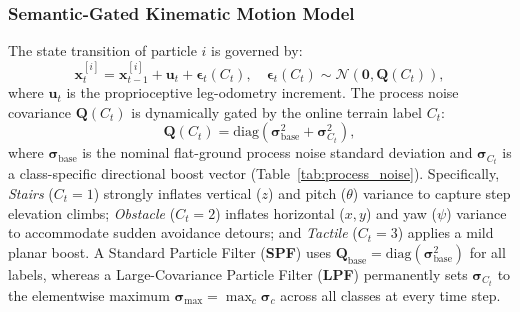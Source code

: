 \documentclass[11pt, a4paper]{article}
\begin{document}
\subsubsection{Semantic-Gated Kinematic Motion Model}
The state transition of particle $i$ is governed by:
\begin{equation}
    \mathbf{x}^{[i]}_t = \mathbf{x}^{[i]}_{t-1} + \mathbf{u}_t + \bm{\epsilon}_t(C_t),
    \quad \bm{\epsilon}_t(C_t) \sim \mathcal{N}(\mathbf{0},\mathbf{Q}(C_t)),
    \label{eq:motion}
\end{equation}
where $\mathbf{u}_t$ is the proprioceptive leg-odometry increment. The process noise covariance $\mathbf{Q}(C_t)$ is dynamically gated by the online terrain label $C_t$:
\begin{equation}
    \mathbf{Q}(C_t) = \mathrm{diag}\!\left(\bm{\sigma}_{\text{base}}^{2} + \bm{\sigma}_{C_t}^{2}\right),
    \label{eq:qct}
\end{equation}
where $\bm{\sigma}_{\text{base}}$ is the nominal flat-ground process noise standard deviation and $\bm{\sigma}_{C_t}$ is a class-specific directional boost vector (Table~\ref{tab:process_noise}). Specifically, \textit{Stairs} ($C_t=1$) strongly inflates vertical ($z$) and pitch ($\theta$) variance to capture step elevation climbs; \textit{Obstacle} ($C_t=2$) inflates horizontal ($x,y$) and yaw ($\psi$) variance to accommodate sudden avoidance detours; and \textit{Tactile} ($C_t=3$) applies a mild planar boost. A Standard Particle Filter (\textbf{SPF}) uses $\mathbf{Q}_{\text{base}} = \mathrm{diag}(\bm{\sigma}_{\text{base}}^2)$ for all labels, whereas a Large-Covariance Particle Filter (\textbf{LPF}) permanently sets $\bm{\sigma}_{C_t}$ to the elementwise maximum $\bm{\sigma}_{\max} = \max_c \bm{\sigma}_c$ across all classes at every time step.
\end{document}
